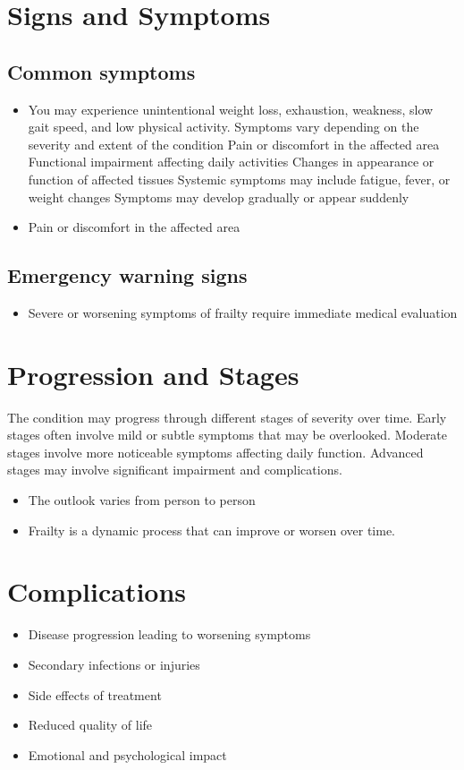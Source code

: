 \section{Signs and Symptoms}

\subsection{Common symptoms}
\begin{itemize}[noitemsep]
  \item You may experience unintentional weight loss, exhaustion, weakness, slow gait speed, and low physical activity. Symptoms vary depending on the severity and extent of the condition Pain or discomfort in the affected area Functional impairment affecting daily activities Changes in appearance or function of affected tissues Systemic symptoms may include fatigue, fever, or weight changes Symptoms may develop gradually or appear suddenly
  \item Pain or discomfort in the affected area
  \end{itemize}

\subsection{Emergency warning signs}
\begin{itemize}[noitemsep]
  \item Severe or worsening symptoms of frailty require immediate medical evaluation
\end{itemize}
\section{Progression and Stages}
The condition may progress through different stages of severity over time. Early stages often involve mild or subtle symptoms that may be overlooked. Moderate stages involve more noticeable symptoms affecting daily function. Advanced stages may involve significant impairment and complications.

\begin{itemize}[noitemsep]
  \item The outlook varies from person to person
  \item Frailty is a dynamic process that can improve or worsen over time.
\end{itemize}
\section{Complications}
\begin{itemize}[noitemsep]
  \item Disease progression leading to worsening symptoms
  \item Secondary infections or injuries
  \item Side effects of treatment
  \item Reduced quality of life
  \item Emotional and psychological impact
\end{itemize}

